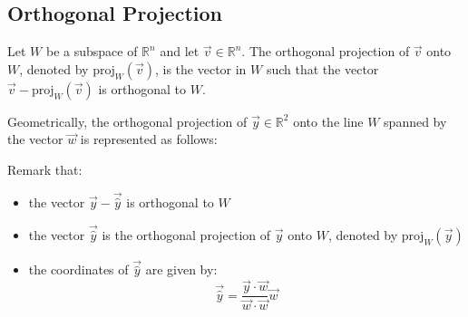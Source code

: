 \subsection{Orthogonal Projection}
\begin{definition}
    Let $W$ be a subspace of $\mathbb{R}^n$ and let $\vec{v} \in \mathbb{R}^n$. The orthogonal projection of $\vec{v}$ onto $W$, denoted by $\text{proj}_W(\vec{v})$, is the vector in $W$ such that the vector $\vec{v} - \text{proj}_W(\vec{v})$ is orthogonal to $W$.
\end{definition}
Geometrically, the orthogonal projection of $\vec{y} \in \mathbb{R}^2$ onto the line $W$ spanned by the vector $\vec{w}$ is represented as follows:
\begin{center}
\end{center}
Remark that:
\begin{itemize}[itemsep=1pt,label=$\circ$]
    \item the vector $\vec{y} - \vec{\hat{y}}$ is orthogonal to $W$
    \item the vector $\vec{\hat{y}}$ is the orthogonal projection of $\vec{y}$ onto $W$, denoted by $\text{proj}_W(\vec{y})$
    \item the coordinates of $\vec{\hat{y}}$ are given by:
    \[
        \vec{\hat{y}} = \frac{\vec{y} \cdot \vec{w}}{\vec{w} \cdot \vec{w}} \vec{w}
    \]
\end{itemize}

